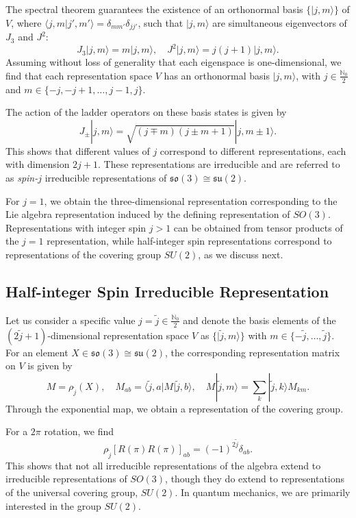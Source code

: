 The spectral theorem guarantees the existence of an orthonormal basis $\{ |j, m\rangle \}$ of $V$, where $\langle j, m | j', m' \rangle = \delta_{mm'} \delta_{jj'}$, such that $|j, m \rangle$ are simultaneous eigenvectors of $J_3$ and $J^2$:
\[
J_3 |j, m \rangle = m |j, m \rangle, \quad J^2 |j, m \rangle = j(j+1) |j, m \rangle.
\]
Assuming without loss of generality that each eigenspace is one-dimensional, we find that each representation space $V$ has an orthonormal basis $|j, m \rangle$, with $j \in \frac{\mathbb{N}_0}{2}$ and $m \in \{-j, -j+1, \dots, j-1, j\}$.

The action of the ladder operators on these basis states is given by
\[
J_\pm |j, m \rangle = \sqrt{(j \mp m)(j \pm m + 1)} |j, m \pm 1 \rangle.
\]
This shows that different values of $j$ correspond to different representations, each with dimension $2j + 1$. These representations are irreducible and are referred to as \emph{spin-$j$} irreducible representations of $\mathfrak{so}(3) \cong \mathfrak{su}(2)$.

For $j = 1$, we obtain the three-dimensional representation corresponding to the Lie algebra representation induced by the defining representation of $SO(3)$. Representations with integer spin $j > 1$ can be obtained from tensor products of the $j = 1$ representation, while half-integer spin representations correspond to representations of the covering group $SU(2)$, as we discuss next.

\subsection{Half-integer Spin Irreducible Representation}

Let us consider a specific value $j = \tilde{j} \in \frac{\mathbb{N}_0}{2}$ and denote the basis elements of the $(2\tilde{j} + 1)$-dimensional representation space $V$ as $\{ |\tilde{j}, m \rangle \}$ with $m \in \{-\tilde{j}, \dots, \tilde{j}\}$. For an element $X \in \mathfrak{so}(3) \cong \mathfrak{su}(2)$, the corresponding representation matrix on $V$ is given by
\[
M = \rho_{\tilde{j}}(X), \quad M_{ab} = \langle \tilde{j}, a | M | \tilde{j}, b \rangle, \quad M | \tilde{j}, m \rangle = \sum_k | \tilde{j}, k \rangle M_{km}.
\]
Through the exponential map, we obtain a representation of the covering group.

For a $2\pi$ rotation, we find
\[
\rho_{\tilde{j}}[R(\pi)R(\pi)]_{ab} = (-1)^{2\tilde{j}} \delta_{ab}.
\]
This shows that not all irreducible representations of the algebra extend to irreducible representations of $SO(3)$, though they do extend to representations of the universal covering group, $SU(2)$. In quantum mechanics, we are primarily interested in the group $SU(2)$.

